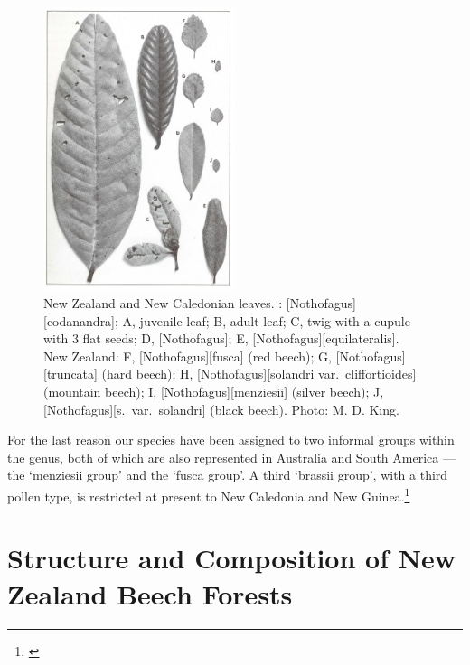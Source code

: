 \begin{figure}
	\includegraphics[width=0.5\textwidth]{graphics/figure70nothofagus.jpg}
	\centering
	\caption[New Zealand and New Caledonian Nothofagus leaves]{New Zealand and New Caledonian  leaves.
: [Nothofagus][codanandra]; A, juvenile leaf; B, adult leaf; C, twig with a cupule with 3 flat seeds; D, [Nothofagus]; E, [Nothofagus][equilateralis].
New Zealand: F, [Nothofagus][fusca] (red beech); G, [Nothofagus][truncata] (hard beech); H, [Nothofagus][solandri var.\ cliffortioides] (mountain beech); I, [Nothofagus][menziesii] (silver beech); J, [Nothofagus][s.\ var.\ solandri] (black beech).
	Photo: M. D. King.}%
	\label{fig:70nothofagus}
\end{figure}

For the last reason our species have been assigned to two informal groups within the genus, both of which are also represented in Australia and South America --- the `menziesii group' and the `fusca group'.
A third `brassii group', with a third pollen type, is restricted at present to New Caledonia and New Guinea.\footnote{\cite{cranwell1939southern}}

\section{Structure and Composition of New Zealand Beech Forests}

